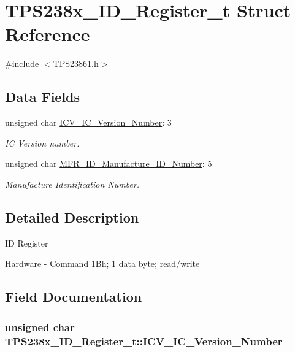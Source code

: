 \hypertarget{struct_t_p_s238x___i_d___register__t}{\section{T\-P\-S238x\-\_\-\-I\-D\-\_\-\-Register\-\_\-t Struct Reference}
\label{struct_t_p_s238x___i_d___register__t}
}


{\ttfamily \#include $<$T\-P\-S23861.\-h$>$}

\subsection*{Data Fields}
\begin{DoxyCompactItemize}
\item 
unsigned char \hyperlink{struct_t_p_s238x___i_d___register__t_a770892cb819120725c29b70a5174140a}{I\-C\-V\-\_\-\-I\-C\-\_\-\-Version\-\_\-\-Number}\-: 3
\begin{DoxyCompactList}\small\item\em I\-C Version number. \end{DoxyCompactList}\item 
unsigned char \hyperlink{struct_t_p_s238x___i_d___register__t_a2692e9107a90c7b9ffc0d4be7b68feb6}{M\-F\-R\-\_\-\-I\-D\-\_\-\-Manufacture\-\_\-\-I\-D\-\_\-\-Number}\-: 5
\begin{DoxyCompactList}\small\item\em Manufacture Identification Number. \end{DoxyCompactList}\end{DoxyCompactItemize}


\subsection{Detailed Description}
I\-D Register \par
 Hardware -\/ Command 1\-Bh; 1 data byte; read/write \par
 

\subsection{Field Documentation}
\hypertarget{struct_t_p_s238x___i_d___register__t_a770892cb819120725c29b70a5174140a}{
\subsubsection[{I\-C\-V\-\_\-\-I\-C\-\_\-\-Version\-\_\-\-Number}]{\setlength{\rightskip}{0pt plus 5cm}unsigned char T\-P\-S238x\-\_\-\-I\-D\-\_\-\-Register\-\_\-t\-::\-I\-C\-V\-\_\-\-I\-C\-\_\-\-Version\-\_\-\-Number}}\label{struct_t_p_s238x___i_d___register__t_a770892cb819120725c29b70a5174140a}


